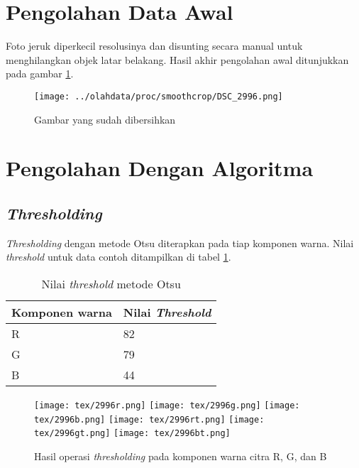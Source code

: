 \documentclass[laporan.tex]{subfiles}
\begin{document}
\section{Pengolahan Data Awal}

Foto jeruk diperkecil resolusinya dan disunting secara manual untuk menghilangkan objek latar belakang. Hasil akhir pengolahan awal ditunjukkan pada gambar \ref{fig:imgedited}.


\begin{figure}[h!]
\centering
\texttt{[image: ../olahdata/proc/smoothcrop/DSC\_2996.png]}
\caption{Gambar yang sudah dibersihkan}
\label{fig:imgedited}
\end{figure}

\section{Pengolahan Dengan Algoritma}

\subsection{\emph{Thresholding}}

\emph{Thresholding} dengan metode Otsu diterapkan pada tiap komponen warna. Nilai \emph{threshold} untuk data contoh ditampilkan di tabel \ref{table:threshval}.

\begin{table}[h]
\centering
\begin{tabular}{|l|l|}
\hline
Komponen warna & Nilai \emph{Threshold} \\
\hline
R & 82 \\
G & 79 \\
B & 44 \\
\hline
\end{tabular}
\caption{Nilai \emph{threshold} metode Otsu}
\label{table:threshval}
\end{table}

\begin{figure}[h!]
\centering
\texttt{[image: tex/2996r.png]} \hskip 0.5cm
\texttt{[image: tex/2996g.png]} \hskip 0.5cm
\texttt{[image: tex/2996b.png]}
\vskip 1cm
\texttt{[image: tex/2996rt.png]} \hskip 0.5cm
\texttt{[image: tex/2996gt.png]} \hskip 0.5cm
\texttt{[image: tex/2996bt.png]}
\caption{Hasil operasi \emph{thresholding} pada komponen warna citra R, G, dan B}
\end{figure}
\end{document}
